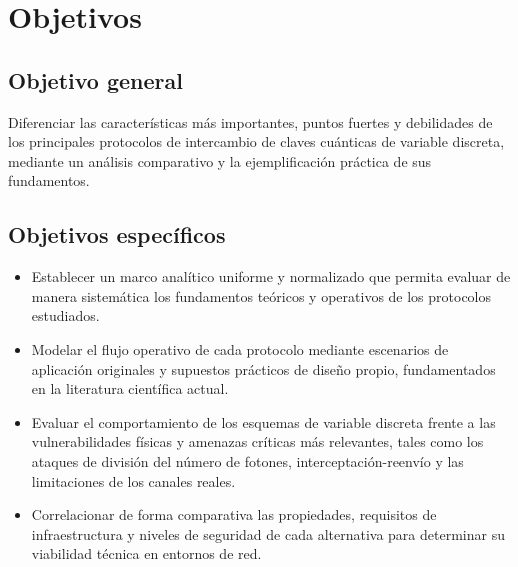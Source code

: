 \chapter{Objetivos}

\section{Objetivo general}
Diferenciar las características más importantes, puntos fuertes y debilidades de los principales protocolos de intercambio de claves cuánticas de variable discreta, mediante un análisis comparativo y la ejemplificación práctica de sus fundamentos.

\section{Objetivos específicos}
\begin{itemize}
    \item Establecer un marco analítico uniforme y normalizado que permita evaluar de manera sistemática los fundamentos teóricos y operativos de los protocolos estudiados.
    \item Modelar el flujo operativo de cada protocolo mediante escenarios de aplicación originales y supuestos prácticos de diseño propio, fundamentados en la literatura científica actual.
    \item Evaluar el comportamiento de los esquemas de variable discreta frente a las vulnerabilidades físicas y amenazas críticas más relevantes, tales como los ataques de división del número de fotones, interceptación-reenvío y las limitaciones de los canales reales.
    \item Correlacionar de forma comparativa las propiedades, requisitos de infraestructura y niveles de seguridad de cada alternativa para determinar su viabilidad técnica en entornos de red.
\end{itemize}

